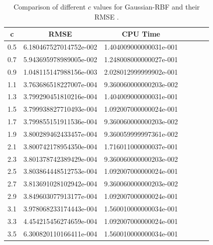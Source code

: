 \documentclass[12pt]{article}
\numberwithin{equation}{subsection} %
\begin{document}
\begin{table}[h]
\centering
 \caption{Comparison of different $c$ values for Gaussian-RBF and their RMSE .}\label{Tab_1DFinal}
\vspace{5mm}
\begin{tabular}{|c|c|c|c|c|c|c|}
  \hline
  c &  RMSE & CPU Time \\
  \hline
  0.5 & 6.180467527014752e-002 &  1.404009000000031e-001  \\
  0.7 & 5.943695978989005e-002  &1.248008000000027e-001   \\
  0.9 &1.048115147988156e-003   & 2.028012999999902e-001   \\
  1.1 &3.763686518227007e-004   &9.360060000000203e-002 \\
  1.3 &3.799290451810216e-004  &1.404009000000031e-001 \\
  1.5 &3.799938827710493e-004   &1.092007000000024e-001  \\
  1.7 &3.799855151911536e-004   & 9.360060000000203e-002  \\
  1.9 &3.800289462433457e-004   &9.360059999997361e-002    \\
  2.1 & 3.800742178954350e-004  & 1.716011000000037e-001 \\
  2.3& 3.801378742389429e-004&9.360060000000203e-002\\
  2.5&3.803864448512753e-004&1.092007000000024e-001\\
  2.7&3.813691028102942e-004  &9.360060000000203e-002\\
  2.9&3.849603077913177e-004&1.092007000000024e-001\\
  3.1&3.978068233174443e-004 &1.560010000000034e-001\\
  3.3& 4.454215456274659e-004    &1.092007000000024e-001\\
  3.5&6.300820110166411e-004   &1.560010000000034e-001\\
  \hline

\end{tabular}
\end{table}
\end{document}

